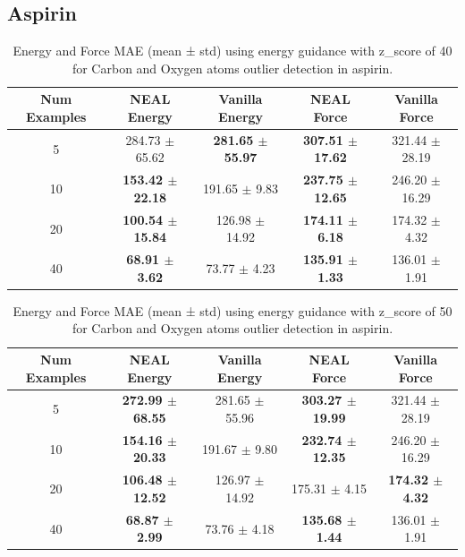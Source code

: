 \documentclass[12pt]{article}
\theoremstyle{definition}
\theoremstyle{remark}
\begin{document}
\subsection{Aspirin}
\begin{table}[h!]
\centering
\begin{tabular}{c|cc|cc}
\hline
\textbf{Num Examples} &
\textbf{NEAL Energy} & \textbf{Vanilla Energy} &
\textbf{NEAL Force} & \textbf{Vanilla Force} \\
\hline

5 &
284.73 $\pm$ 65.62 &
\textbf{281.65 $\pm$ 55.97} &
\textbf{307.51 $\pm$ 17.62} &
321.44 $\pm$ 28.19 \\

10 &
\textbf{153.42 $\pm$ 22.18} &
191.65 $\pm$ 9.83 &
\textbf{237.75 $\pm$ 12.65} &
246.20 $\pm$ 16.29 \\

20 &
\textbf{100.54 $\pm$ 15.84} &
126.98 $\pm$ 14.92 &
\textbf{174.11 $\pm$ 6.18} &
174.32 $\pm$ 4.32 \\

40 &
\textbf{68.91 $\pm$ 3.62} &
73.77 $\pm$ 4.23 &
\textbf{135.91 $\pm$ 1.33} &
136.01 $\pm$ 1.91 \\
\hline
\end{tabular}
\caption{Energy and Force MAE (mean ± std) using energy guidance with z\_score of 40 for Carbon and Oxygen atoms outlier detection in aspirin.}
\end{table}



\begin{table}[htbp]
\centering
\begin{tabular}{c|cc|cc}
\hline
\textbf{Num Examples} &
\textbf{NEAL Energy} & \textbf{Vanilla Energy} &
\textbf{NEAL Force} & \textbf{Vanilla Force} \\
\hline

5  &
\textbf{272.99 $\pm$ 68.55} &
281.65 $\pm$ 55.96 &
\textbf{303.27 $\pm$ 19.99} &
321.44 $\pm$ 28.19 \\

10 &
\textbf{154.16 $\pm$ 20.33} &
191.67 $\pm$ 9.80 &
\textbf{232.74 $\pm$ 12.35} &
246.20 $\pm$ 16.29 \\

20 &
\textbf{106.48 $\pm$ 12.52} &
126.97 $\pm$ 14.92 &
175.31 $\pm$ 4.15 &
\textbf{174.32 $\pm$ 4.32} \\

40 &
\textbf{68.87 $\pm$ 2.99} &
73.76 $\pm$ 4.18 &
\textbf{135.68 $\pm$ 1.44} &
136.01 $\pm$ 1.91 \\

\hline
\end{tabular}
\caption{Energy and Force MAE (mean ± std) using energy guidance with z\_score of 50 for Carbon and Oxygen atoms outlier detection in aspirin.}
\end{table}
\end{document}
